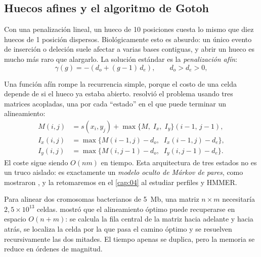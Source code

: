 \subsection{Huecos afines y el algoritmo de Gotoh}

Con una penalización lineal, un hueco de 10 posiciones cuesta lo mismo que diez huecos de 1 posición dispersos. Biológicamente esto es absurdo: un único evento de inserción o deleción suele afectar a varias bases contiguas, y abrir un hueco es mucho más raro que alargarlo. La solución estándar es la \emph{penalización afín}:
\begin{equation}\label{eq:03-afin}
\gamma(g) = -\left(d_o + (g-1)\,d_e\right), \qquad d_o > d_e > 0,
\end{equation}

\begin{simbolos}
\end{simbolos}

Una función afín rompe la recurrencia simple, porque el costo de una celda depende de si el hueco ya estaba abierto. \textcite{c03-gotoh1982} resolvió el problema usando tres matrices acopladas, una por cada ``estado'' en el que puede terminar un alineamiento:
\begin{align}
M(i,j)   &= s(x_i,y_j) + \max\{M,\; I_x,\; I_y\}(i{-}1,\,j{-}1),\label{eq:03-gotoh-m}\\
I_x(i,j) &= \max\{M(i{-}1,j) - d_o,\;\; I_x(i{-}1,j) - d_e\},\\
I_y(i,j) &= \max\{M(i,j{-}1) - d_o,\;\; I_y(i,j{-}1) - d_e\}.
\end{align}
El coste sigue siendo $O(nm)$ en tiempo. Esta arquitectura de tres estados no es un truco aislado: es exactamente un \emph{modelo oculto de Márkov de pares}, como mostraron \textcite{c03-durbin1998}, y la retomaremos en el \cref{cap:04} al estudiar perfiles y HMMER.

\begin{profundizacion}
Para alinear dos cromosomas bacterianos de \SI{5}{Mb}, una matriz $n\times m$ necesitaría $2{,}5\times10^{13}$ celdas. \textcite{c03-hirschberg1975} mostró que el alineamiento óptimo puede recuperarse en espacio $O(n+m)$: se calcula la fila central de la matriz hacia adelante y hacia atrás, se localiza la celda por la que pasa el camino óptimo y se resuelven recursivamente las dos mitades. El tiempo apenas se duplica, pero la memoria se reduce en órdenes de magnitud.
\end{profundizacion}

